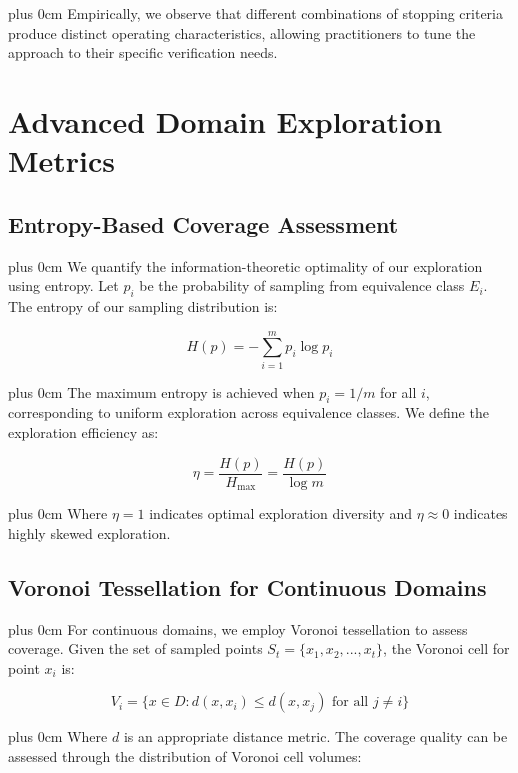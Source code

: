 \documentclass[11pt,a4paper]{article}
\newcommand{\justifytext}{\leftskip=0pt \rightskip=0pt plus 0cm}
\begin{document}
\justifytext
Empirically, we observe that different combinations of stopping criteria produce distinct operating characteristics, allowing practitioners to tune the approach to their specific verification needs.

\section{Advanced Domain Exploration Metrics}

\subsection{Entropy-Based Coverage Assessment}

\justifytext
We quantify the information-theoretic optimality of our exploration using entropy. Let $p_i$ be the probability of sampling from equivalence class $E_i$. The entropy of our sampling distribution is:

\begin{equation}
H(p) = -\sum_{i=1}^{m} p_i \log p_i
\end{equation}

\justifytext
The maximum entropy is achieved when $p_i = 1/m$ for all $i$, corresponding to uniform exploration across equivalence classes. We define the exploration efficiency as:

\begin{equation}
\eta = \frac{H(p)}{H_{\max}} = \frac{H(p)}{\log m}
\end{equation}

\justifytext
Where $\eta = 1$ indicates optimal exploration diversity and $\eta \approx 0$ indicates highly skewed exploration.

\subsection{Voronoi Tessellation for Continuous Domains}

\justifytext
For continuous domains, we employ Voronoi tessellation to assess coverage. Given the set of sampled points $S_t = \{x_1, x_2, ..., x_t\}$, the Voronoi cell for point $x_i$ is:

\begin{equation}
V_i = \{x \in D : d(x, x_i) \leq d(x, x_j) \text{ for all } j \neq i\}
\end{equation}

\justifytext
Where $d$ is an appropriate distance metric. The coverage quality can be assessed through the distribution of Voronoi cell volumes:
\end{document}
